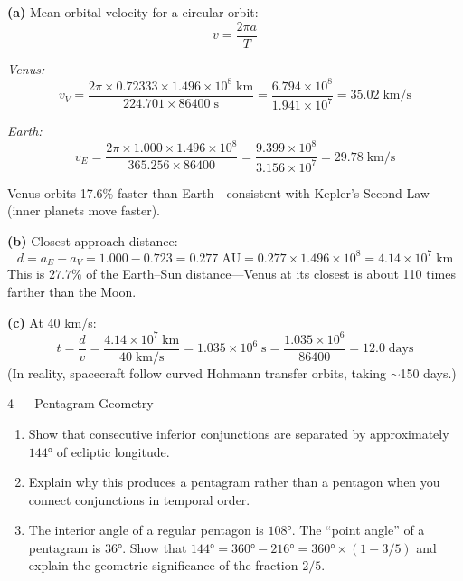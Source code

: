 \documentclass[11pt,letterpaper]{article}
\begin{document}
\begin{solution}
\textbf{(a)} Mean orbital velocity for a circular orbit:
\[
  v = \frac{2\pi a}{T}
\]

\textit{Venus:}
\[
  v_V = \frac{2\pi \times 0.72333 \times 1.496 \times 10^8\;\text{km}}
  {224.701 \times 86400\;\text{s}}
  = \frac{6.794 \times 10^8}{1.941 \times 10^7}
  = \boxed{35.02\;\text{km/s}}
\]

\textit{Earth:}
\[
  v_E = \frac{2\pi \times 1.000 \times 1.496 \times 10^8}
  {365.256 \times 86400}
  = \frac{9.399 \times 10^8}{3.156 \times 10^7}
  = \boxed{29.78\;\text{km/s}}
\]

Venus orbits 17.6\% faster than Earth—consistent with Kepler's
Second Law (inner planets move faster).

\textbf{(b)} Closest approach distance:
\[
  d = a_E - a_V = 1.000 - 0.723 = 0.277\;\text{AU}
  = 0.277 \times 1.496 \times 10^8 = 4.14 \times 10^7\;\text{km}
\]
This is $\boxed{27.7\%}$ of the Earth–Sun distance—Venus at its
closest is about 110 times farther than the Moon.

\textbf{(c)} At 40 km/s:
\[
  t = \frac{d}{v} = \frac{4.14 \times 10^7\;\text{km}}{40\;\text{km/s}}
  = 1.035 \times 10^6\;\text{s}
  = \frac{1.035 \times 10^6}{86400}
  = \boxed{12.0\;\text{days}}
\]
(In reality, spacecraft follow curved Hohmann transfer orbits,
taking $\sim$150 days.)
\end{solution}

\newpage

\begin{problem}{4 — Pentagram Geometry}
\begin{enumerate}[label=(\alph*)]
  \item Show that consecutive inferior conjunctions are separated
    by approximately $144°$ of ecliptic longitude.
  \item Explain why this produces a pentagram rather than a pentagon
    when you connect conjunctions in temporal order.
  \item The interior angle of a regular pentagon is $108°$. The
    ``point angle'' of a pentagram is $36°$. Show that
    $144° = 360° - 216° = 360° \times (1 - 3/5)$ and explain the
    geometric significance of the fraction $2/5$.
\end{enumerate}
\end{problem}
\end{document}
